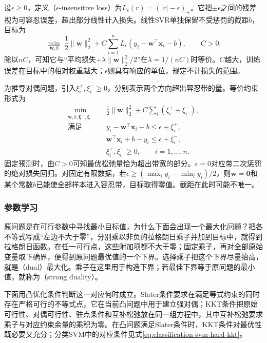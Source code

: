 设$\epsilon\geq0$，定义（$\epsilon$-insensitive loss）为$L_\epsilon(r)=(|r|-\epsilon)_+$。它把$\pm\epsilon$之间的残差视为可容忍误差，超出部分线性计入损失。线性SVR单独保留不受惩罚的截距$b$，目标为
\begin{equation}
  \min_{\bm{w},b}\;
    \frac12\lVert\bm{w}\rVert_2^2+
    C\sum_{i=1}^{n}L_\epsilon(y_i-\bm{w}^{\top}\bm{x}_i-b),
    \qquad C>0.
  \label{eq:regression-svr-objective}
\end{equation}
除以$nC$，可知它与“平均损失$+\lambda\lVert\bm{w}\rVert_2^2/2$”在$\lambda=1/(nC)$时等价。$C$越大，训练误差在目标中的相对权重越大；$\epsilon$则具有响应的单位，规定不计损失的范围。

为推导对偶问题，引入$\xi_i^+,\xi_i^-\geq0$，分别表示两个方向超出容忍带的量。等价约束形式为
\begin{equation}
  \begin{aligned}
    \min_{\bm{w},b,\bm{\xi}^+,\bm{\xi}^-}\quad&
       \tfrac12\lVert\bm{w}\rVert_2^2+C\sum_i(\xi_i^++\xi_i^-),\\
    \text{满足}\quad&
       y_i-\bm{w}^{\top}\bm{x}_i-b\leq\epsilon+\xi_i^+,\\
      &\bm{w}^{\top}\bm{x}_i+b-y_i\leq\epsilon+\xi_i^-,\\
      &\xi_i^+,\xi_i^-\geq0,\qquad i=1,\ldots,n.
  \end{aligned}
  \label{eq:regression-svr-primal}
\end{equation}
固定预测时，由$C>0$可知最优松弛量恰为超出带宽的部分。$\epsilon=0$对应带二次惩罚的绝对损失回归。对固定有限数据，若$\epsilon\geq(\max_i y_i-\min_i y_i)/2$，则$\bm{w}=\bm{0}$和某个常数$b$已能使全部样本进入容忍带，目标取得零值。截距在此时可能不唯一。

\subsubsection{参数学习}

原问题是在可行参数中寻找最小目标值，为什么下面会出现一个最大化问题？把各不等式写成“左边不大于零”，分别乘以非负的拉格朗日乘子并加到目标中，就得到拉格朗日函数。在任一可行点，这些附加项都不大于零；固定乘子，再对全部原始变量取下确界，便得到原问题最优值的一个下界。选择乘子把这个下界尽量抬高，就是（dual）最大化。乘子在这里用于构造下界；若最佳下界等于原问题的最小值，就称为（strong duality）。

下面用凸优化条件判断这一对应何时成立。Slater条件要求在满足等式约束的同时存在严格可行的不等式点，它在当前凸问题中用于建立强对偶；KKT条件把原始可行性、对偶可行性、驻点条件和互补松弛放在同一组方程中，其中互补松弛要求乘子与对应约束余量的乘积为零。在凸问题满足Slater条件时，KKT条件对最优性既必要又充分；分类SVM中的对应条件见式\eqref{eq:classification-svm-hard-kkt}。

